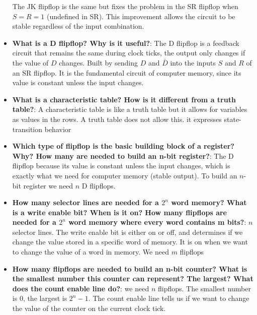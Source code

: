 \documentclass{report}
\begin{document}
\begin{itemize}
            The JK flipflop is the same but fixes the problem in the SR flipflop when $S = R = 1$ (undefined in SR). This improvement allows the circuit to be stable regardless of the input combination.
        \item \textbf{What is a D flipflop? Why is it useful?}:
            The D flipflop is a feedback circuit that remains the same during clock ticks, the output only changes if the value of $D$ changes.
            \bigbreak \noindent 
            Built by sending $D$ and $\bar{D}$ into the inputs $S$ and $R$ of an SR flipflop.
            \bigbreak \noindent 
            It is the fundamental circuit of computer memory, since its value is constant unless the input changes.
        \item \textbf{What is a characteristic table? How is it different from a truth table?}:
            A characteristic table is like a truth table but it allows for variables as values in the rows. A truth table does not allow this.
            \bigbreak \noindent 
            it expresses state-transition behavior
        \item \textbf{Which type of flipflop is the basic building block of a register? Why? How many are needed to build an n-bit register?}:
            The D flipflop because its value is constant unless the input changes, which is exactly what we need for computer memory (stable output). To build an $n$-bit register we need $n$ D flipflops.
        \item \textbf{How many selector lines are needed for a $2^{n}$ word memory? What is a write enable bit? When is it on? How many flipflops are needed for a $2^{n}$ word memory where every word contains m bits?}:
            $n$ selector lines. The write enable bit is either on or off, and determines if we change the value stored in a specific word of memory. It is on when we want to change the value of a word in memory. We need $m$ flipflops
        \item \textbf{How many flipflops are needed to build an n-bit counter? What is the smallest number this counter can represent? The largest? What does the count enable line do?}:
            we need $n$ flipflops. The smallest number is $0$, the largest is $2^{n} -1$. The count enable line tells us if we want to change the value of the counter on the current clock tick.
    \end{itemize}



    
\end{document}
